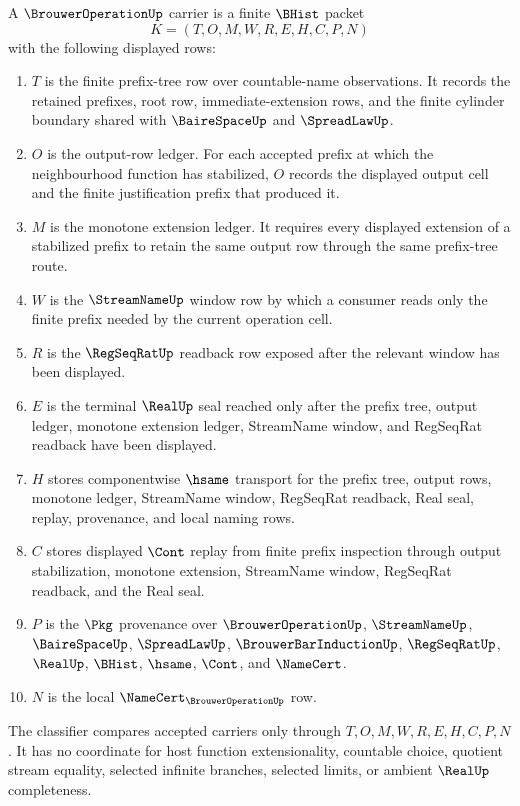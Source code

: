 \begin{definition}
\label{def:brouwer-operation-carrier}
A $\BrouwerOperationUp$ carrier is a finite $\BHist$ packet
$$
K=(T,O,M,W,R,E,H,C,P,N)
$$
with the following displayed rows:
\begin{enumerate}
\item $T$ is the finite prefix-tree row over countable-name observations. It records the retained prefixes, root row, immediate-extension rows, and the finite cylinder boundary shared with $\BaireSpaceUp$ and $\SpreadLawUp$.
\item $O$ is the output-row ledger. For each accepted prefix at which the neighbourhood function has stabilized, $O$ records the displayed output cell and the finite justification prefix that produced it.
\item $M$ is the monotone extension ledger. It requires every displayed extension of a stabilized prefix to retain the same output row through the same prefix-tree route.
\item $W$ is the $\StreamNameUp$ window row by which a consumer reads only the finite prefix needed by the current operation cell.
\item $R$ is the $\RegSeqRatUp$ readback row exposed after the relevant window has been displayed.
\item $E$ is the terminal $\RealUp$ seal reached only after the prefix tree, output ledger, monotone extension ledger, StreamName window, and RegSeqRat readback have been displayed.
\item $H$ stores componentwise $\hsame$ transport for the prefix tree, output rows, monotone ledger, StreamName window, RegSeqRat readback, Real seal, replay, provenance, and local naming rows.
\item $C$ stores displayed $\Cont$ replay from finite prefix inspection through output stabilization, monotone extension, StreamName window, RegSeqRat readback, and the Real seal.
\item $P$ is the $\Pkg$ provenance over $\BrouwerOperationUp$, $\StreamNameUp$, $\BaireSpaceUp$, $\SpreadLawUp$, $\BrouwerBarInductionUp$, $\RegSeqRatUp$, $\RealUp$, $\BHist$, $\hsame$, $\Cont$, and $\NameCert$.
\item $N$ is the local $\NameCert_{\BrouwerOperationUp}$ row.
\end{enumerate}
The classifier compares accepted carriers only through $T,O,M,W,R,E,H,C,P,N$. It has no coordinate for host function extensionality, countable choice, quotient stream equality, selected infinite branches, selected limits, or ambient $\RealUp$ completeness.
\end{definition}

